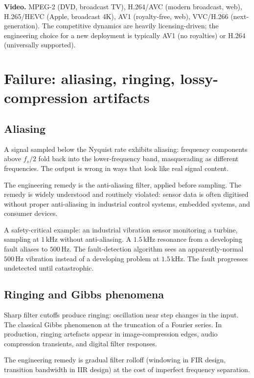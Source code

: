 \textbf{Video.} MPEG-2 (DVD, broadcast TV), H.264/AVC (modern broadcast, web), H.265/HEVC (Apple, broadcast 4K), AV1 (royalty-free, web), VVC/H.266 (next-generation). The competitive dynamics are heavily licensing-driven; the engineering choice for a new deployment is typically AV1 (no royalties) or H.264 (universally supported).

\section{Failure: aliasing, ringing, lossy-compression artifacts}

\subsection{Aliasing}

A signal sampled below the Nyquist rate exhibits aliasing: frequency components above $f_s/2$ fold back into the lower-frequency band, masquerading as different frequencies. The output is wrong in ways that look like real signal content.

The engineering remedy is the anti-aliasing filter, applied before sampling. The remedy is widely understood and routinely violated: sensor data is often digitised without proper anti-aliasing in industrial control systems, embedded systems, and consumer devices.

A safety-critical example: an industrial vibration sensor monitoring a turbine, sampling at $1\,\si{\kilo\hertz}$ without anti-aliasing. A $1.5\,\si{\kilo\hertz}$ resonance from a developing fault aliases to $500\,\si{\hertz}$. The fault-detection algorithm sees an apparently-normal $500\,\si{\hertz}$ vibration instead of a developing problem at $1.5\,\si{\kilo\hertz}$. The fault progresses undetected until catastrophic.

\subsection{Ringing and Gibbs phenomena}

Sharp filter cutoffs produce ringing: oscillation near step changes in the input. The classical Gibbs phenomenon at the truncation of a Fourier series. In production, ringing artefacts appear in image-compression edges, audio compression transients, and digital filter responses.

The engineering remedy is gradual filter rolloff (windowing in FIR design, transition bandwidth in IIR design) at the cost of imperfect frequency separation.

